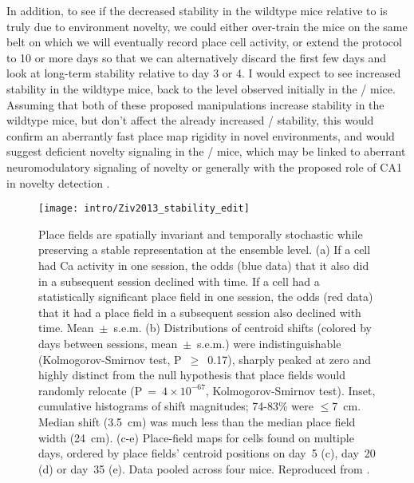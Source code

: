 In addition, to see if the decreased stability in the wildtype mice relative to \citeauthor{Ziv2013} is truly due to environment novelty, we could either over-train the mice on the same belt on which we will eventually record place cell activity, or extend the protocol to 10 or more days so that we can alternatively discard the first few days and look at long-term stability relative to day 3 or 4.
I would expect to see increased stability in the wildtype mice, back to the level observed initially in the \df/ mice.
Assuming that both of these proposed manipulations increase stability in the wildtype mice, but don't affect the already increased \df/ stability, this would confirm an aberrantly fast place map rigidity in novel environments, and would suggest deficient novelty signaling in the \df/ mice, which may be linked to aberrant neuromodulatory signaling of novelty or generally with the proposed role of CA1 in novelty detection \citep{Li2003d, Barry2012c, Larkin2014, Nitz2004}.

\begin{figure}
	\centering
	\texttt{[image: intro/Ziv2013\_stability\_edit]}
	\caption[Place field stability in Ziv et al.]{Place fields are spatially invariant and temporally stochastic while preserving a stable representation at the ensemble level.
	(a) If a cell had Ca activity in one session, the odds (blue data) that it also did in a subsequent session declined with time. If a cell had a statistically significant place field in one session, the odds (red data) that it had a place field in a subsequent session also declined with time. Mean~$\pm$~s.e.m.
	(b) Distributions of centroid shifts (colored by days between sessions, mean~$\pm$~s.e.m.) were indistinguishable (Kolmogorov-Smirnov test, P~$\geq$~0.17), sharply peaked at zero and highly distinct from the null hypothesis that place fields would randomly relocate (P~=~$4\times10^{-67}$, Kolmogorov-Smirnov test). Inset, cumulative histograms of shift magnitudes; 74-83\% were $\leq$7~cm. Median shift (3.5~cm) was much less than the median place field width (24~cm).
	(c-e) Place-field maps for cells found on multiple days, ordered by place fields' centroid positions on day~5 (c), day~20 (d) or day~35 (e). Data pooled across four mice.
	Reproduced from \citet{Ziv2013}.}
	\label{fig:conclusions:ziv_stability}
\end{figure}

